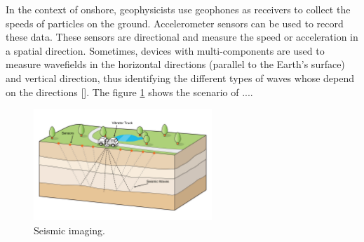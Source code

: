 \begin{itemize}
In the context of onshore, geophysicists use geophones as receivers to collect the speeds of particles on the ground. Accelerometer sensors can be used to record these data. These sensors are directional and measure the speed or acceleration in a spatial direction. Sometimes, devices with multi-components are used to measure wavefields in the horizontal directions (parallel to the Earth's surface) and vertical direction, thus identifying the different types of waves whose depend on the directions []. The figure \ref{geophones} shows the scenario of ....  

\begin{figure}[!h]
\centering 
\includegraphics[width=0.6\textwidth]{images/geophones.jpg}
\caption{Seismic imaging.}
\label{geophones} 
\end{figure}


\end{itemize}
